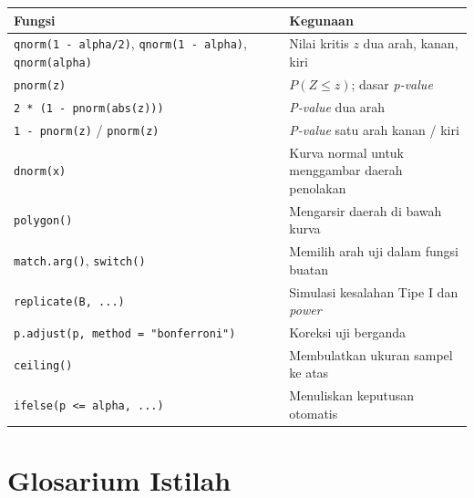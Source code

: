 \documentclass[
  indonesian,
  letterpaper,
]{book}
\newcounter{none} %
\begin{document}
{\def\LTcaptype{none} %
\begin{longtable}[]{@{}
  >{\raggedright\arraybackslash}p{}
  >{\raggedright\arraybackslash}p{}@{}}
\toprule\noalign{}
\begin{minipage}[b]{\linewidth}\raggedright
Fungsi
\end{minipage} & \begin{minipage}[b]{\linewidth}\raggedright
Kegunaan
\end{minipage} \\
\midrule\noalign{}
\endhead
\bottomrule\noalign{}
\endlastfoot
\texttt{qnorm(1\ -\ alpha/2)}, \texttt{qnorm(1\ -\ alpha)},
\texttt{qnorm(alpha)} & Nilai kritis \(z\) dua arah, kanan, kiri \\
\texttt{pnorm(z)} & \(P(Z \le z)\); dasar \emph{p-value} \\
\texttt{2\ *\ (1\ -\ pnorm(abs(z)))} & \emph{P-value} dua arah \\
\texttt{1\ -\ pnorm(z)} / \texttt{pnorm(z)} & \emph{P-value} satu arah
kanan / kiri \\
\texttt{dnorm(x)} & Kurva normal untuk menggambar daerah penolakan \\
\texttt{polygon()} & Mengarsir daerah di bawah kurva \\
\texttt{match.arg()}, \texttt{switch()} & Memilih arah uji dalam fungsi
buatan \\
\texttt{replicate(B,\ ...)} & Simulasi kesalahan Tipe I dan
\emph{power} \\
\texttt{p.adjust(p,\ method\ =\ "bonferroni")} & Koreksi uji berganda \\
\texttt{ceiling()} & Membulatkan ukuran sampel ke atas \\
\texttt{ifelse(p\ \textless{}=\ alpha,\ ...)} & Menuliskan keputusan
otomatis \\
\end{longtable}
}

\section{Glosarium Istilah}\label{glosarium-istilah-6}
\end{document}
